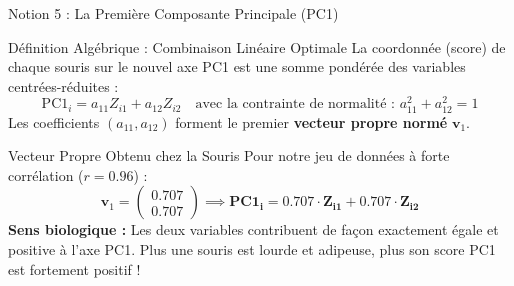 \documentclass[aspectratio=169,10pt]{beamer}
\begin{document}
\begin{frame}{Notion 5 : La Première Composante Principale (PC1)}
  \begin{conceptbox}{Définition Algébrique : Combinaison Linéaire Optimale}
    \footnotesize
    La coordonnée (score) de chaque souris sur le nouvel axe PC1 est une somme pondérée des variables centrées-réduites :
    \begin{equation*}
      \text{PC1}_i = a_{11} Z_{i1} + a_{12} Z_{i2} \quad \text{avec la contrainte de normalité : } a_{11}^2 + a_{12}^2 = 1
    \end{equation*}
    Les coefficients $(a_{11}, a_{12})$ forment le premier \textbf{vecteur propre normé} $\mathbf{v}_1$.
  \end{conceptbox}
  \vspace{1mm}
  \begin{biobox}{Vecteur Propre Obtenu chez la Souris}
    \footnotesize
    Pour notre jeu de données à forte corrélation ($r = 0.96$) :
    \begin{equation*}
      \mathbf{v}_1 = \begin{pmatrix} 0.707 \\ 0.707 \end{pmatrix} \implies \mathbf{\text{PC1}_i = 0.707 \cdot Z_{i1} + 0.707 \cdot Z_{i2}}
    \end{equation*}
    \textbf{Sens biologique :}
    Les deux variables contribuent de façon exactement égale et positive à l'axe PC1. Plus une souris est lourde et adipeuse, plus son score PC1 est fortement positif !
  \end{biobox}
\end{frame}
\end{document}
